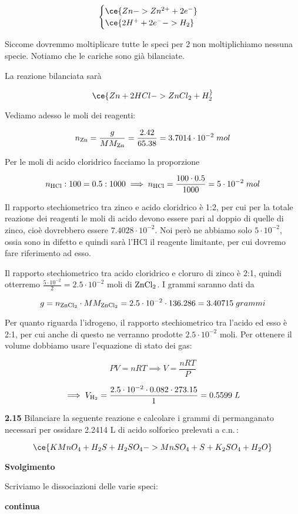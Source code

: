 $$\begin{cases}
    \ce{Zn -> Zn^{2+} + 2e^-}\\
    \ce{2H^{+} + 2e^- -> H_2}
\end{cases}$$

Siccome dovremmo moltiplicare tutte le speci per 2 non moltiplichiamo nessuna specie. Notiamo che le cariche sono già bilanciate.

La reazione bilanciata sarà

$$\ce{Zn + 2HCl -> ZnCl_2 + H_2 ^}$$

Vediamo adesso le moli dei reagenti:

$$n_{\rm Zn}=\frac{g}{MM_{\rm Zn}}=\frac{2.42}{65.38}=3.7014 \cdot 10^{-2}\;mol$$

Per le moli di acido cloridrico facciamo la proporzione

$$n_{\rm HCl}:100=0.5:1000
\implies
n_{\rm HCl}=\frac{100 \cdot 0.5}{1000}=5 \cdot 10^{-2}\;mol$$

Il rapporto stechiometrico tra zinco e acido cloridrico è 1:2, per cui per la totale reazione dei reagenti le moli di acido devono essere pari al doppio di quelle di zinco, cioè dovrebbero essere $7.4028 \cdot 10^{-2}$. Noi però ne abbiamo solo $5 \cdot 10^{-2}$, ossia sono in difetto e quindi sarà l'HCl il reagente limitante, per cui dovremo fare riferimento ad esso.

Il rapporto stechiometrico tra acido cloridrico e cloruro di zinco è 2:1, quindi otterremo $\frac{5\cdot 10^{-2}}{2}=2.5 \cdot 10^{-2}$ moli di $\rm ZnCl_2$. I grammi saranno dati da

$$g=n_{\rm ZnCl_2} \cdot MM_{\rm ZnCl_2}=2.5 \cdot 10^{-2} \cdot 136.286=3.40715\;grammi$$

Per quanto riguarda l'idrogeno, il rapporto stechiometrico tra l'acido ed esso è 2:1, per cui anche di questo ne verranno prodotte $2.5 \cdot 10^{-2}$ moli. Per ottenere il volume dobbiamo usare l'equazione di stato dei gas:

$$PV=nRT \implies V=\frac{nRT}{P}$$

$$\implies V_{\rm H_2}
=\frac{2.5 \cdot 10^{-2} \cdot 0.082 \cdot 273.15}{1}
=0.5599\;L$$

\vspace{0.2cm}\textbf{2.15} Bilanciare la seguente reazione e calcolare i grammi di permanganato necessari per ossidare 2.2414 L di acido solforico prelevati a c.n.\,:

$$\ce{KMnO_4 + H_2S + H_2SO_4 -> MnSO_4 + S + K_2SO_4 + H_2O}$$

\vspace{0.2cm}\large\textbf{Svolgimento}\normalsize

\vspace{0.2cm}Scriviamo le dissociazioni delle varie speci:

\textbf{continua}